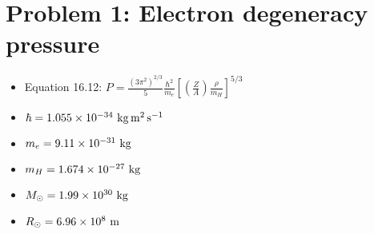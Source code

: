 \documentclass[11pt,letterpaper]{article}
\begin{document}
\section*{Problem 1: Electron degeneracy pressure}

\begin{itemize}
    \item Equation 16.12: $P = \frac{(3\pi^2)^{2/3}}{5}\frac{\hbar^2}{m_e}\left[\left(\frac{Z}{A}\right)\frac{\rho}{m_H}\right]^{5/3}$
    \item $\hbar = 1.055\times 10^{-34}~{\rm kg\,m^2\,s^{-1}}$
    \item $m_e = 9.11\times 10^{-31}~{\rm kg}$
    \item $m_H = 1.674\times 10^{-27}~{\rm kg}$
    \item $M_\odot = 1.99\times 10^{30}~{\rm kg}$
    \item $R_\odot = 6.96\times 10^{8}~{\rm m}$
\end{itemize}
\end{document}
